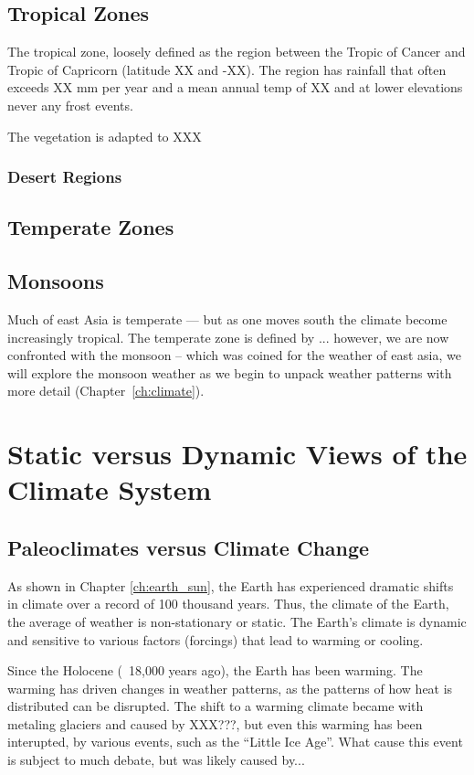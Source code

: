 \subsection{Tropical Zones}

The tropical zone, loosely defined as the region between the Tropic of Cancer and Tropic of Capricorn (latitude XX and -XX). The region has rainfall that often exceeds XX mm per year and a mean annual temp of XX and at lower elevations never any frost events. 

The vegetation is adapted to XXX 

\subsubsection{Desert Regions}

\subsection{Temperate Zones}

\subsection{Monsoons}

Much of east Asia is temperate --- but as one moves south the climate become increasingly tropical. The temperate zone is defined by ... however, we are now confronted with the monsoon -- which was coined for the weather of east asia, we will explore the monsoon weather as we begin to unpack weather patterns with more detail (Chapter~\ref{ch:climate}). 


\section{Static versus Dynamic Views of the Climate System}

\subsection{Paleoclimates versus Climate Change}

As shown in Chapter \ref{ch:earth_sun}, the Earth has experienced dramatic shifts in climate over a record of 100 thousand years. Thus, the climate of the Earth, the average of weather is non-stationary or static. The Earth's climate is dynamic and sensitive to various factors (forcings) that lead to warming or cooling.

Since the Holocene (~18,000 years ago), the Earth has been warming. The warming has driven changes in weather patterns, as the patterns of how heat is distributed can be disrupted. The shift to a warming climate became with metaling glaciers and caused by XXX???, but even this warming has been interupted, by various events, such as the ``Little Ice Age''. What cause this event is subject to much debate, but was likely caused by...

